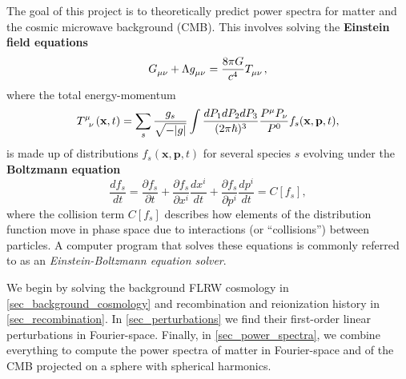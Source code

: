 \documentclass[10pt,a4paper]{article}
\begin{document}
The goal of this project is to theoretically predict
power spectra for matter and the cosmic microwave background (CMB).
This involves solving the \textbf{Einstein field equations}
\begin{equation}
	G\indices{_\mu_\nu} + \Lambda g\indices{_\mu_\nu} = \frac{8 \pi G}{c^4} T\indices{_\mu_\nu},
\label{eq_einstein}
\end{equation}
where the total energy-momentum \cite{dodelsonModernCosmology2021}
\begin{equation}
	T\indices{^\mu_\nu}(\mathbf{x},t) = \sum_s \frac{g_s}{\sqrt{-|g|}} \int \frac{dP_1 dP_2 dP_3}{(2\pi\hbar)^3} \frac{P^\mu P_\nu}{P^0} f_s(\mathbf{x},\mathbf{p},t),
\label{eq_energy_momentum}
\end{equation}
is made up of distributions $f_s(\mathbf{x},\mathbf{p},t)$ for several species $s$
evolving under the \textbf{Boltzmann equation}
\begin{equation}
	\frac{df_s}{dt} = \frac{\partial f_s}{\partial t} + \frac{\partial f_s}{\partial x^i} \frac{dx^i}{dt} + \frac{\partial f_s}{\partial p^i} \frac{d p^i}{dt} = C[f_s],
\label{eq_boltzmann}
\end{equation}
where the collision term $C[f_s]$ describes how
elements of the distribution function move in phase space
due to interactions (or ``collisions'') between particles.
A computer program that solves these equations
is commonly referred to as an \emph{Einstein-Boltzmann equation solver}.

We begin by
solving the background FLRW cosmology in \cref{sec_background_cosmology}
and recombination and reionization history in \cref{sec_recombination}.
In \cref{sec_perturbations} we find their first-order linear perturbations in Fourier-space.
Finally, in \cref{sec_power_spectra}, we combine everything
to compute the power spectra of matter in Fourier-space
and of the CMB projected on a sphere with spherical harmonics.
\end{document}
